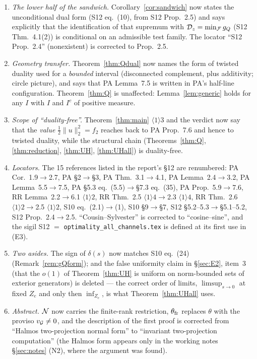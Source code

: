 \documentclass[11pt]{article}
\newcommand{\norm}[1]{\lVert #1\rVert}\newcommand{\abs}[1]{\lvert #1\rvert}
\begin{document}
\begin{enumerate}[leftmargin=2.6em,itemsep=2pt]
 so nothing downstream changes.
\item[\textbf{R5}] \emph{The lower half of the sandwich.}  Corollary~\ref{cor:sandwich} now
 states the unconditional dual form (S12 eq.~(10), from S12 Prop.~2.5) and says explicitly that
 the identification of that supremum with $\mathcal D_z=\min_\mathcal F g_Q$ (S12 Thm.~4.1(2)) is
 conditional on an admissible test family.  The locator ``S12 Prop.~2.4'' (nonexistent) is
 corrected to Prop.~2.5.
\item[\textbf{R6}] \emph{Geometry transfer.}  Theorem~\ref{thm:Qdual} now names the form of
 twisted duality used for a \emph{bounded} interval (disconnected complement, plus additivity;
 circle picture), and says that PA Lemma~7.5 is written in PA's half-line configuration.
 Theorem~\ref{thm:Q} is unaffected: Lemma~\ref{lem:generic} holds for any $I$ with $I$ and $I^c$
 of positive measure.
\item[\textbf{R7}] \emph{Scope of ``duality-free''.}  Theorem~\ref{thm:main} $\langle1\rangle3$
 and the verdict now say that the \emph{value} $\tfrac12\norm u_2^2=f_2$ reaches back to PA
 Prop.~7.6 and hence to twisted duality, while the structural chain
 (Theorems~\ref{thm:Q}, \ref{thm:reduction}, \ref{thm:UH}, \ref{thm:UHall}) is duality-free.
\item[\textbf{R8}] \emph{Locators.}  The 15 references listed in the report's \S12 are
 renumbered: PA Cor.~1.9$\to$2.7, PA \S2$\to$\S3, PA Thm.~3.1$\to$4.1, PA Lemma~2.4$\to$3.2,
 PA Lemma~5.5$\to$7.5, PA \S5.3 eq.~(5.5)$\to$\S7.3 eq.~(35), PA Prop.~5.9$\to$7.6,
 RR Lemma~2.2$\to$6.1 $\langle1\rangle2$, RR Thm.~2.5 $\langle1\rangle4\to$2.3
 $\langle1\rangle4$, RR Thm.~2.6 $\langle1\rangle2\to$2.5 $\langle1\rangle2$,
 S10 eq.~(2.1)$\to$(1), S10 \S9$\to$\S7, S12 \S5.2--5.3$\to$\S5.1--5.2,
 S12 Prop.~2.4$\to$2.5.  ``Cousin--Sylvester'' is corrected to ``cosine--sine'', and the sigil
 S12 $=$ \texttt{optimality\_all\_channels.tex} is defined at its first use in (E3).
\item[\textbf{R9}] \emph{Two asides.}  The sign of $\delta(s)$ now matches S10 eq.~(24)
 (Remark~\ref{rem:gQform}); and the false uniformity claim in \S\ref{sec:E2}, item~3 (that the
 $o(1)$ of Theorem~\ref{thm:UH} is uniform on norm-bounded sets of exterior generators) is
 deleted --- the correct order of limits, $\limsup_{s\to0}$ at fixed $Z_e$ and only then
 $\inf_{Z_e}$, is what Theorem~\ref{thm:UHall} uses.
\item[\textbf{R10}] \emph{Abstract.}  $\mathcal N$ now carries the finite-rank restriction,
 $\theta_{\rm fr}$ replaces $\theta$ with the proviso $v_\mathcal G\ne0$, and the description of the
 first proof is corrected from ``Halmos two-projection normal form'' to ``invariant
 two-projection computation'' (the Halmos form appears only in the working notes \S\ref{sec:notes}
 (N2), where the argument was found).
\end{enumerate}
\end{document}
